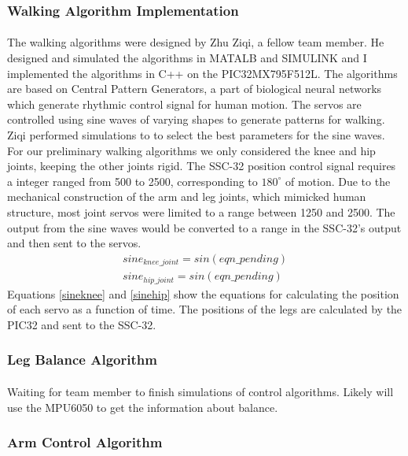 \documentclass[letterpaper]{article}
\begin{document}
\subsubsection{Walking Algorithm Implementation} 
\paragraph{} The walking algorithms were designed by Zhu Ziqi, a fellow team
member. He designed and simulated the algorithms in MATALB and SIMULINK and I
implemented the algorithms in C++ on the PIC32MX795F512L. The algorithms are
based on Central Pattern Generators, a part of biological neural networks which
generate rhythmic control signal for human motion\cite{cpggeneral}. The servos
are controlled using sine waves of varying shapes to generate patterns for
walking. Ziqi performed simulations to to select the best parameters for the
sine waves. For our preliminary walking algorithms we only considered the knee
and hip joints, keeping the other joints rigid. The SSC-32 position control
signal requires a integer ranged from 500 to 2500, corresponding to
$180^{\circ}$ of motion\cite{sscdata}. Due to the mechanical construction of the
arm and leg joints, which mimicked human structure, most joint servos were
limited to a range between 1250 and 2500. The output from the sine waves would
be converted to a range in the SSC-32's output and then sent to the servos. 
\begin{align}
    sine_{knee\_joint}=sin(eqn\_pending) \label{sineknee}\\
    sine_{hip\_joint}=sin(eqn\_pending) \label{sinehip}
\end{align}
Equations \ref{sineknee} and \ref{sinehip} show the equations for calculating
the position of each servo as a function of time. The positions of the legs are
calculated by the PIC32 and sent to the SSC-32.

\subsubsection{Leg Balance Algorithm}
\paragraph{} Waiting for team member to finish simulations of control
algorithms. Likely will use the MPU6050 to get the information about balance.

\subsubsection{Arm Control Algorithm}
\end{document}
